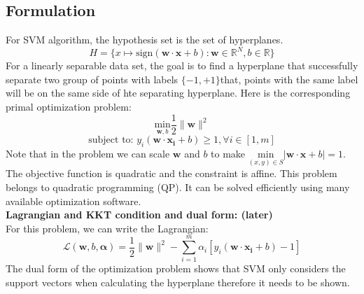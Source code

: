 \documentclass[12pt]{article}
\theoremstyle{definition}
\theoremstyle{remark}
\numberwithin{equation}{section}
\begin{document}
\subsection{Formulation}
For SVM algorithm, the hypothesis set is the set of hyperplanes.
\[H = \{x\mapsto \mathrm{sign}(\mathbf{w\cdot x}+b): \mathbf{w} \in \mathbb{R}^N, b \in \mathbb{R} \}\]
For a linearly separable data set, the goal is to find a hyperplane that successfully separate two group of points with labels $\{-1,+1\}$that, points with the same label will be on the same side of hte separating hyperplane. Here is the corresponding primal optimization problem:
\[\underset{\mathbf{w}, b}{\mathrm{min}} \frac{1}{2}\|\mathbf{w}\|^2\]
\[\text{subject to: } y_i(\mathbf{w\cdot x_i}+b) \geq 1, \forall i \in [1,m]\]
Note that in the problem we can scale $\mathbf{w}$ and $b$ to make $\underset{(x,y)\in S}{\mathrm{min}}|\mathbf{w\cdot x}+b| =1 $.
The objective function is quadratic and the constraint is affine. This problem belongs to quadratic programming (QP). It can be solved efficiently using many available optimization software. \\[0.2cm]
\textbf{Lagrangian and KKT condition and dual form: (later)} \\[0.2cm]
For this problem, we can write the Lagrangian:
\[\mathcal{L}(\mathbf{w},b,\mathbf{\alpha})=\frac{1}{2}\|\mathbf{w}\|^2-\sum_{i=1}^{m}\alpha_i [y_i(\mathbf{w\cdot x_i}+b)-1]\]
The dual form of the optimization problem shows that SVM only considers the support vectors when calculating the hyperplane therefore it needs to be shown.
\end{document}
